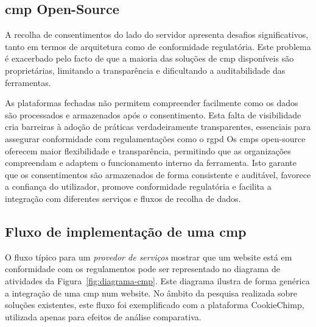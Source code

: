 \subsection{\acrshort{cmp} Open-Source}

A recolha de consentimentos do lado do servidor apresenta desafios significativos, tanto em termos de arquitetura como de conformidade regulatória. Este problema é exacerbado pelo facto de que a maioria das soluções de \acrshort{cmp} disponíveis são proprietárias, limitando a transparência e dificultando a auditabilidade das ferramentas.

As plataformas fechadas não permitem compreender facilmente como os dados são processados e armazenados após o consentimento. Esta falta de visibilidade cria barreiras à adoção de práticas verdadeiramente transparentes, essenciais para assegurar conformidade com regulamentações como o \acrshort{rgpd}
Os \acrshort{cmp}s open-source oferecem maior flexibilidade e transparência, permitindo que as organizações compreendam e adaptem o funcionamento interno da ferramenta. Isto garante que os consentimentos são armazenados de forma consistente e auditável, favorece a confiança do utilizador, promove conformidade regulatória e facilita a integração com diferentes serviços e fluxos de recolha de dados.

\subsection{Fluxo de implementação de uma \acrshort{cmp}}

O fluxo típico para um \textit{provedor de serviços} mostrar que um website está em conformidade com os regulamentos pode ser representado no diagrama de atividades da Figura~\ref{fig:diagrama-cmp}.
Este diagrama ilustra de forma genérica a integração de uma \acrshort{cmp} num website.
No âmbito da pesquisa realizada sobre soluções existentes, este fluxo foi exemplificado com a plataforma CookieChimp, utilizada apenas para efeitos de análise comparativa.

